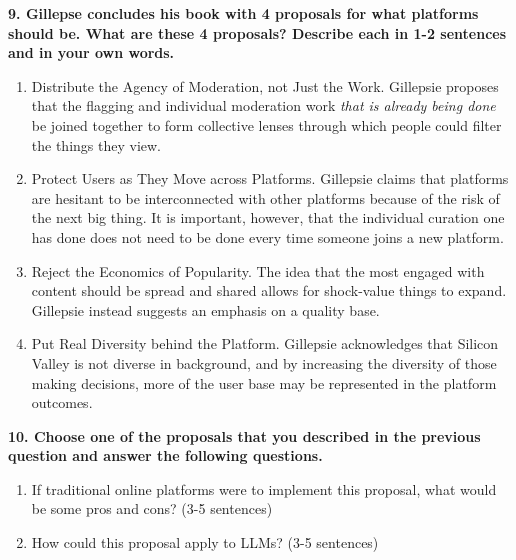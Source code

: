 \documentclass{article}
\begin{document}
\textbf{9. Gillepse concludes his book with 4 proposals for what platforms should be. What are these 4 proposals? Describe each in 1-2 sentences and in your own words.}

\bigskip
\begin{mdframed}
\begin{enumerate}
    \item Distribute the Agency of Moderation, not Just the Work. Gillepsie proposes that the flagging and individual moderation work \textit{that is already being done} be joined together to form collective lenses through which people could filter the things they view.
    \item Protect Users as They Move across Platforms. Gillepsie claims that platforms are hesitant to be interconnected with other platforms because of the risk of the next big thing. It is important, however, that the individual curation one has done does not need to be done every time someone joins a new platform. 
    \item Reject the Economics of Popularity. The idea that the most engaged with content should be spread and shared allows for shock-value things to expand. Gillepsie instead suggests an emphasis on a quality base. 
    \item Put Real Diversity behind the Platform. Gillepsie acknowledges that Silicon Valley is not diverse in background, and by increasing the diversity of those making decisions, more of the user base may be represented in the platform outcomes. 
\end{enumerate}
\end{mdframed}
\bigskip

\textbf{10. Choose one of the proposals that you described in the previous question and answer the following questions.}
\begin{enumerate}[label=\Alph*.]
    \item If traditional online platforms were to implement this proposal, what would be some pros and cons? (3-5 sentences)
    \item How could this proposal apply to LLMs? (3-5 sentences)  
\end{enumerate}

\bigskip
\end{document}
